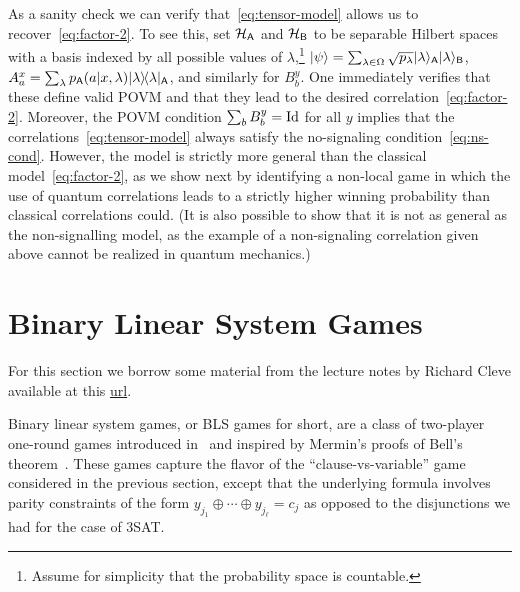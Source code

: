 As a sanity check we can verify that~\eqref{eq:tensor-model} allows us to recover~\eqref{eq:factor-2}. To see this, set $\mathcal{H}_{\textsf{A}}$ and $\mathcal{H}_{\textsf{B}}$ to be separable Hilbert spaces with a basis indexed by all possible values of $\lambda$,\footnote{Assume for simplicity that the probability space is countable.} $|\psi\rangle = \sum_{\lambda \in \Omega} \sqrt{p_\lambda} |\lambda\rangle_{\textsf{A}} |\lambda\rangle_{\textsf{B}}$, $A^x_a = \sum_\lambda p_{\textsf{A}}(a|x,\lambda) |\lambda\rangle\!\langle\lambda|_{\textsf{A}}$, and similarly for $B^y_b$. One immediately verifies that these define valid POVM and that they lead to the desired correlation~\eqref{eq:factor-2}. Moreover, the POVM condition $\sum_b B^y_b = \mathop{\rm Id}\nolimits$ for all $y$ implies that the correlations~\eqref{eq:tensor-model} always satisfy the no-signaling condition~\eqref{eq:ns-cond}. 
 However, the model is strictly more general than the classical model~\eqref{eq:factor-2}, as we show next by identifying a non-local game in which the use of quantum correlations leads to a strictly higher winning probability than classical correlations could. (It is also possible to show that it is not as general as the non-signalling model, as the example of a non-signaling correlation given above cannot be realized in quantum mechanics.)

\section{Binary Linear System Games}

For this section we borrow some material from the lecture notes by Richard Cleve available at this \href{http://cleve.iqc.uwaterloo.ca/resources/Qic890LectureNotes2019Apr22(V22).pdf}{url}. 

\medskip

Binary linear system games, or BLS games for short, are a class of two-player one-round  games introduced in~\cite{cleve2014characterization} and inspired by Mermin's proofs of Bell's theorem~\cite{mermin1990simple,mermin1993hidden}. These games  capture the flavor of the ``clause-vs-variable'' game considered in the previous section, except that the underlying formula involves parity constraints of the form $y_{j_1}\oplus\cdots\oplus y_{j_\ell}=c_j$ as opposed to the disjunctions we had for the case of $3$SAT. 

